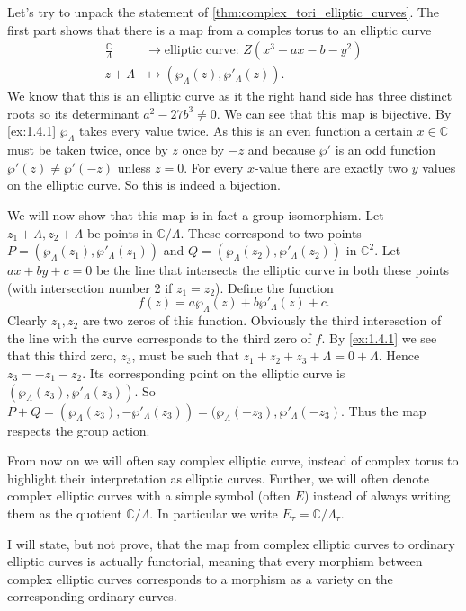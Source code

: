 \documentclass[a4paper]{article}
\theoremstyle{theoremdd}
\theoremstyle{definitiondd}
\theoremstyle{remarkdd}
\newcommand{\C}{\mathbb{C}}
\begin{document}
Let's try to unpack the statement of \cref{thm:complex_tori_elliptic_curves}.
The first part shows that there is a map from a comples torus to an elliptic curve 
\begin{align*}
	\frac{\C}{\Lambda} &\longrightarrow \text{elliptic curve: } Z(x^3 - a x - b -y ^2) \\
	z+\Lambda &\longmapsto \left(\wp_\Lambda(z), \wp'_\Lambda(z)\right)
.\end{align*}
We know that this is an elliptic curve as it the right hand side has three distinct roots so its determinant $a^2 - 27 b^3 \ne 0  $.
We can see that this map is bijective. By \cref{ex:1.4.1}  $\wp_\Lambda$  takes every value twice. As this is an even function a certain $x \in \C$ must be taken twice, once by $z$ once by $-z$ and because $\wp'$ is an odd function $\wp'(z) \ne \wp'(-z)$ unless $z = 0$.  For every $x$-value there are exactly two $y$ values on the elliptic curve. So this is indeed a bijection. 

We will now show that this map is in fact a group isomorphism.
Let $z_1 + \Lambda, z_2 + \Lambda$ be points in $\C / \Lambda$.
These correspond to two points $P = (\wp_{\Lambda}(z_1), \wp'_\Lambda(z_1))$ and $ Q = (\wp_{\Lambda}(z_2), \wp'_\Lambda(z_2))$ in $\C^2$. 
Let $ax + by + c = 0$ be the line that intersects the elliptic curve in both these points (with intersection number 2 if  $z_1 = z_2$).
Define the function \[
	f(z) = a \wp_{\Lambda}(z) + b \wp'_\Lambda(z) + c
.\] 
Clearly $z_1, z_2$ are two zeros of this function. Obviously the third interesction of the line with the curve corresponds to the third zero of $f$. 
By \cref{ex:1.4.1} we see that this third zero, $z_3$, must be such that $z_1 + z_2 + z_3 + \Lambda = 0 + \Lambda$. 
Hence $z_3 = - z_1 - z_2$. Its corresponding point on the elliptic curve is 
$(\wp_\Lambda(z_3), \wp'_\Lambda(z_3))$.
So $P + Q = (\wp_\Lambda(z_3), - \wp'_\Lambda(z_3)) = (\wp_\Lambda(-z_3), \wp'_\Lambda(-z_3)$. 
Thus the map respects the group action. 


From now on we will often say complex elliptic curve, instead of complex torus to highlight their interpretation as elliptic curves. Further, we will often denote complex elliptic curves with a simple symbol (often $E$) instead of always writing them as the quotient  $\C / \Lambda$. In particular we write $E_\tau  = \C / \Lambda_\tau$.

I will state, but not prove, that the map from complex elliptic curves to ordinary elliptic curves is actually functorial, meaning that every morphism between complex elliptic curves corresponds to a morphism as a variety on the corresponding ordinary curves.
\end{document}
